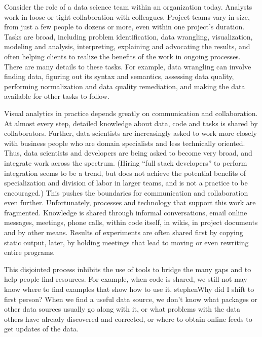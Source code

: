 
\maketitle

Consider the role of a data science team within an organization today.
Analysts work in loose or tight collaboration with colleagues.
Project teams vary in size, from just a few people to dozens or
more, even within one project's duration. Tasks are broad, including problem
identification, data wrangling, visualization, modeling and analysis,
interpreting, explaining and advocating the results, and often helping
clients to realize the benefits of the work in ongoing processes.
There are many details to these tasks.
For example, data wrangling can involve finding data, figuring out its
syntax and semantics, assessing data quality, performing normalization and
data quality remediation, and making the data available for other tasks
to follow.

Visual analytics in practice depends greatly on communication and collaboration.
At almost every step, detailed knowledge about data, code and tasks
is shared by collaborators. 
Further, data scientists are increasingly asked to work more closely
with business people who are domain specialists and less technically oriented.
Thus, data scientists and developers are being asked to become
very broad, and integrate work across the spectrum. (Hiring ``full stack
developers'' to perform integration seems to be a trend, but does not achieve
the potential benefits of specialization and division of labor in larger
teams, and is not a practice to be encouraged.)
This pushes the boundaries for communication and collaboration even further.
Unfortunately, processes and technology that support this work are fragmented.
Knowledge is shared through informal conversations, email online messages,
meetings, phone calls, within code itself, in wikis, in project documents and
by other means. Results of experiments are often shared first by copying static
output, later, by holding meetings that lead to moving or even rewriting
entire programs.

This disjointed process inhibits the use of tools to bridge
the many gaps and to help people find resources.
For example, when code is shared, we still not may know where to find examples
that show how to use it. stephen{Why did I shift to first person?}
When we find a useful data source, we don't know what packages or
other data sources usually go along with it, or what problems with the data
others have already discovered and corrected, or where to obtain online feeds
to get updates of the data.

